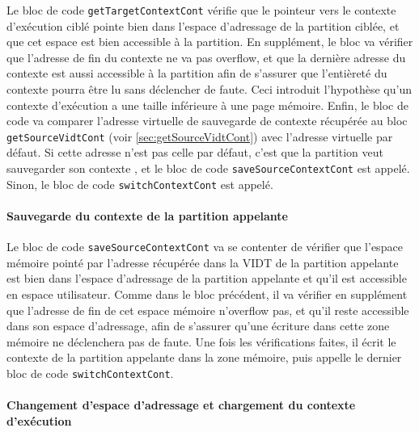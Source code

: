 		Le bloc de code \texttt{getTargetContextCont} vérifie que le pointeur vers le contexte d'exécution ciblé pointe bien dans l'espace d'adressage de la partition ciblée, et que cet espace est bien accessible à la partition. En supplément, le bloc va vérifier que l'adresse de fin du contexte ne va pas overflow, et que la dernière adresse du contexte est aussi accessible à la partition afin de s'assurer que l'entièreté du contexte pourra être lu sans déclencher de faute. Ceci introduit l'hypothèse qu'un contexte d'exécution a une taille inférieure à une page mémoire.
		Enfin, le bloc de code va comparer l'adresse virtuelle de sauvegarde de contexte récupérée au bloc \texttt{getSourceVidtCont} (voir \ref{sec:getSourceVidtCont}) avec l'adresse virtuelle par défaut. Si cette adresse n'est pas celle par défaut, c'est que la partition veut sauvegarder son contexte , et le bloc de code \texttt{saveSourceContextCont} est appelé. Sinon, le bloc de code \texttt{switchContextCont} est appelé.

		\paragraph{Sauvegarde du contexte de la partition appelante}

		Le bloc de code \texttt{saveSourceContextCont} va se contenter de vérifier que l'espace mémoire pointé par l'adresse récupérée dans la VIDT de la partition appelante est bien dans l'espace d'adressage de la partition appelante et qu'il est accessible en espace utilisateur. Comme dans le bloc précédent, il va vérifier en supplément que l'adresse de fin de cet espace mémoire n'overflow pas, et qu'il reste accessible dans son espace d'adressage, afin de s'assurer qu'une écriture dans cette zone mémoire ne déclenchera pas de faute. Une fois les vérifications faites, il écrit le contexte de la partition appelante dans la zone mémoire, puis appelle le dernier bloc de code \texttt{switchContextCont}.

		\paragraph{Changement d'espace d'adressage et chargement du contexte d'exécution}

